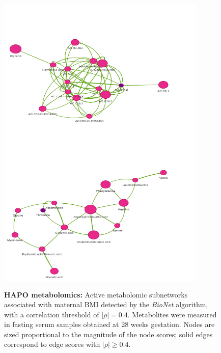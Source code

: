 	\begin{figure}[!hbt]
				\centering		
				\includegraphics[height=15cm,width=10cm]{dd_corr04_2clusters.png}	
				\caption{{\bf HAPO metabolomics:} Active metabolomic subnetworks associated with maternal BMI detected by the {\it BioNet} algorithm, with a correlation threshold of $|\rho|=0.4$. Metabolites were measured in fasting serum samples obtained at 28 weeks gestation. Nodes are sized proportional to the magnitude of the node scores; solid edges correspond to edge scores with $|\rho| \ge 0.4$.}
				\label{plotmod13}
			\end{figure} 
